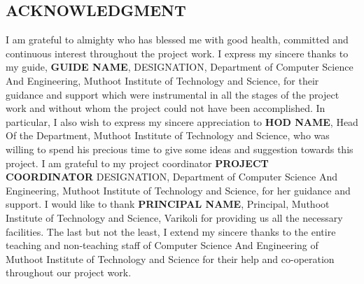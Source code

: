 \begin{center}
    \section*{ACKNOWLEDGMENT}
\end{center}

\noindent
\newline
I am grateful to almighty who has blessed me with good health, committed and continuous interest throughout the project work.
\newline
\newline
I express my sincere thanks to my guide, \textbf{GUIDE NAME}, DESIGNATION, Department of Computer Science And Engineering, Muthoot Institute of Technology and Science, for their guidance and support which were instrumental in all the stages of the project work and without whom the project could not have been accomplished.
\newline
\newline
In particular, I also wish to express my sincere appreciation to \textbf{HOD NAME}, Head Of the Department, Muthoot Institute of Technology and Science, who was willing to spend his precious time to give some ideas and suggestion towards this project.
\newline
\newline
I am grateful to my project coordinator \textbf{PROJECT COORDINATOR} DESIGNATION, Department of Computer Science And Engineering, Muthoot Institute of Technology and Science, for her guidance and support.
\newline
\newline
I would like to thank \textbf{PRINCIPAL NAME}, Principal, Muthoot Institute of Technology and Science, Varikoli for providing us all the necessary facilities.
\newline
\newline
The last but not the least, I extend my sincere thanks to the entire teaching and non-teaching staff of Computer Science And Engineering of Muthoot Institute of Technology and Science for their help and co-operation throughout our project work.
